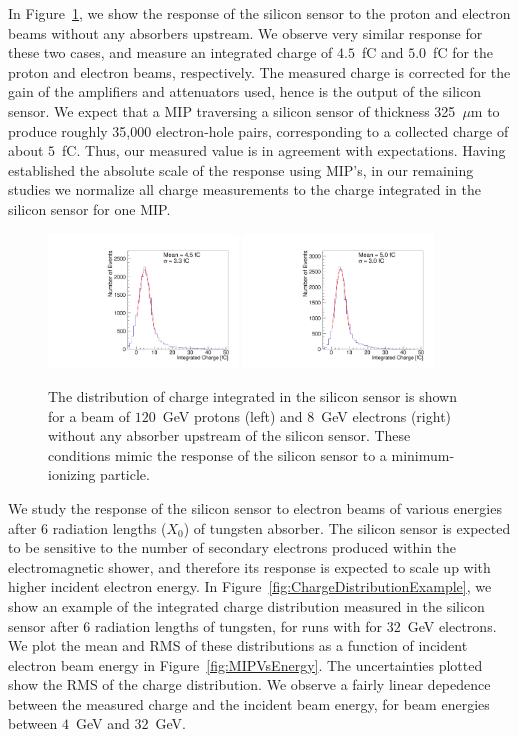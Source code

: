 \documentclass[12pt]{article}
\begin{document}
{In Figure~\ref{fig:MIP}, we show the response of the silicon sensor to the
proton and electron beams without any absorbers upstream. We observe very
similar response for these two cases, and measure an integrated charge of
$4.5$~fC and $5.0$~fC for the proton and electron beams, respectively. The
measured charge is corrected for the gain of the amplifiers and attenuators
used, hence is the output of the silicon sensor. We expect that a MIP traversing
a silicon sensor of thickness 325~$\mu$m to produce roughly 35,000 electron-hole
pairs, corresponding to a collected charge of about $5$~fC. Thus, our measured value is
in agreement with expectations. Having established the absolute scale of
the  response using MIP's, in our remaining studies we normalize all
charge measurements to the charge integrated in the silicon sensor for one MIP. 

\begin{figure}[htbp] 
\centering
\includegraphics[width=0.45\textwidth]{plots/Proton_charge.pdf} 
\includegraphics[width=0.45\textwidth]{plots/Electron_0X0_charge.pdf} 
\caption{The distribution of charge integrated in the silicon sensor is shown
for a beam of $120$~GeV protons (left) and $8$~GeV electrons (right) without
any absorber upstream of the silicon sensor. These conditions mimic the response
of the silicon sensor to a minimum-ionizing particle. 
} 
\label{fig:MIP} 
\end{figure} 

We study the response of the silicon sensor to electron beams of various
energies after 6 radiation lengths ($X_0$) of tungsten absorber. The silicon
sensor is expected to be sensitive to the number of secondary electrons produced
within the electromagnetic shower, and therefore its response is expected to
scale up with higher incident electron energy. In
Figure~\ref{fig:ChargeDistributionExample}, we show an example of the integrated
charge distribution measured in the silicon sensor after 6 radiation lengths of
tungsten, for runs with for $32$~GeV electrons. We plot the mean and RMS of
these distributions as a function of incident electron beam energy in
Figure~\ref{fig:MIPVsEnergy}. The uncertainties plotted show the RMS of the
charge distribution. We observe a fairly linear depedence between the measured
charge and the incident beam energy, for beam energies between $4$~GeV and
$32$~GeV. 

}
\end{document}
